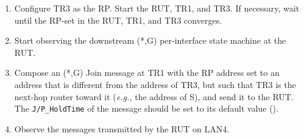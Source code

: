\documentclass[11pt]{report}
\newcommand{\eg}{\emph{e.g.,}\xspace}
\begin{document}
\begin{enumerate}

  \item Configure TR3 as the RP. Start the RUT, TR1, and TR3. If
  necessary, wait until the RP-set in the RUT, TR1, and TR3
  converges.

  \item Start observing the downstream (*,G) per-interface state
  machine at the RUT.

  \item Compose an (*,G) Join message at TR1 with the RP address set
  to an address that is different from the address of TR3, but such that
  TR3 is the next-hop router toward it (\eg the address of S), and send it to
  the RUT.
  The \verb=J/P_HoldTime= of the message should be set to its default
  value ({\PimsmJPHoldTime}).

  \item Observe the messages transmitted by the RUT on LAN4.

\end{enumerate}


\end{document}
